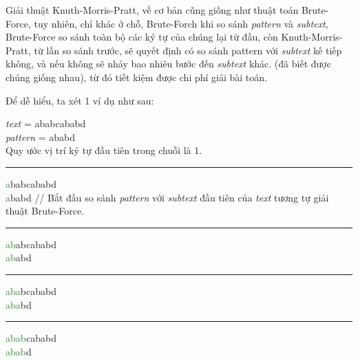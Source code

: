 \documentclass[a4paper,11pt]{article}
\begin{document}
			Giải thuật Knuth-Morris-Pratt, về cơ bản cũng giống như thuật toán Brute-Force, 
			tuy nhiên, chỉ khác ở chỗ, Brute-Forch khi so sánh \textit{pattern} và \textit{subtext}, Brute-Force so sánh toàn bộ 
			các ký tự của chúng lại từ đầu, còn Knuth-Morris-Pratt, từ lần so sánh trước, sẽ quyết định có so sánh pattern với \textit{subtext} kế tiếp không, 
			và nếu không sẽ nhảy bao nhiêu bước đến \textit{subtext} khác. 
			(đã biết được chúng giống nhau), từ đó tiết kiệm được chi phí giải bài toán.

			Để dễ hiểu, ta xét 1 ví dụ như sau: 
			
			\textit{text} \hspace*{6mm}= ababcababd\\
			\textit{pattern} \hspace*{0.3mm}= ababd\\
			Quy ước vị trí ký tự đầu tiên trong chuỗi là 1.
			
			\vspace*{4mm}
			\hrule
			\textcolor{ForestGreen}{a}babcababd\\
			\textcolor{ForestGreen}{a}babd \hspace*{1.8cm} // Bắt đầu so sánh \textit{pattern} với \textit{subtext} đầu tiên của \textit{text} tương tự giải thuật Brute-Force.

			\vspace*{2mm}
			\hrule
			\textcolor{ForestGreen}{ab}abcababd\\
			\textcolor{ForestGreen}{ab}abd
			
			\vspace*{2mm}
			\hrule
			\textcolor{ForestGreen}{aba}bcababd\\
			\textcolor{ForestGreen}{aba}bd

			\vspace*{2mm}
			\hrule
			\textcolor{ForestGreen}{abab}cababd\\
			\textcolor{ForestGreen}{abab}d
\end{document}
